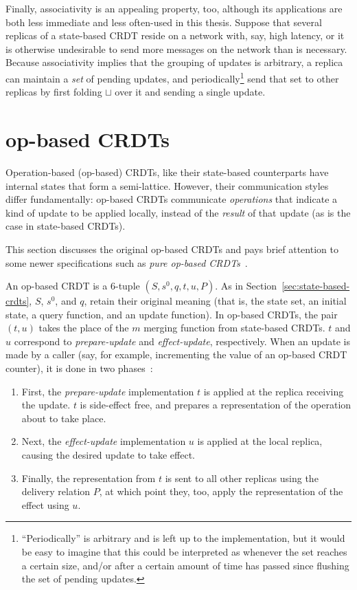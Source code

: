 Finally, associativity is an appealing property, too, although its applications
are both less immediate and less often-used in this thesis. Suppose that several
replicas of a state-based CRDT reside on a network with, say, high latency, or
it is otherwise undesirable to send more messages on the network than is
necessary. Because associativity implies that the grouping of updates is
arbitrary, a replica can maintain a \textit{set} of pending updates, and
periodically\footnote{``Periodically'' is arbitrary and is left up to the
implementation, but it would be easy to imagine that this could be interpreted
as whenever the set reaches a certain size, and/or after a certain amount of
time has passed since flushing the set of pending updates.} send that set to
other replicas by first folding $\sqcup$ over it and sending a single update.

\section{op-based CRDTs}
\label{sec:op-based-crdts}

Operation-based (op-based) CRDTs, like their state-based counterparts have
internal states that form a semi-lattice. However, their communication styles
differ fundamentally: op-based CRDTs communicate \textit{operations} that
indicate a kind of update to be applied locally, instead of the \textit{result}
of that update (as is the case in state-based CRDTs).

This section discusses the original op-based CRDTs and pays brief attention to
some newer specifications such as \textit{pure op-based CRDTs}~\citep{shapiro11,
baquero17}.

An op-based CRDT is a $6$-tuple $(S, s^0, q, t, u, P)$. As in
Section~\ref{sec:state-based-crdts}, $S$, $s^0$, and $q$, retain their
original meaning (that is, the state set, an initial state, a query function,
and an update function). In op-based CRDTs, the pair $(t,u)$ takes the place of
the $m$ merging function from state-based CRDTs. $t$ and $u$ correspond to
\textit{prepare-update} and \textit{effect-update}, respectively. When an update
is made by a caller (say, for example, incrementing the value of an op-based
CRDT counter), it is done in two phases~\citep{shapiro11}:
\begin{enumerate}
  \item First, the \textit{prepare-update} implementation $t$ is applied at the
    replica receiving the update. $t$ is side-effect free, and prepares a
    representation of the operation about to take place.
  \item Next, the \textit{effect-update} implementation $u$ is applied at the
    local replica, causing the desired update to take effect.
  \item Finally, the representation from $t$ is sent to all other replicas using
    the delivery relation $P$, at which point they, too, apply the
    representation of the effect using $u$.
\end{enumerate}

